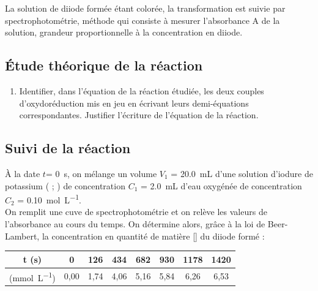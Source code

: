 \documentclass[a4paper,12pt,fleqn]{article}%
\begin{document}
La solution de diiode formée étant colorée, la transformation est suivie par spectrophotométrie, méthode qui consiste  à mesurer l'absorbance A de la solution, grandeur proportionnelle à la concentration en diiode.

	\subsection{Étude théorique de la réaction}
	\begin{enumerate}
		\item Identifier,  dans l'équation de la réaction étudiée, les deux couples d'oxydoréduction mis en jeu en écrivant leurs demi-équations correspondantes.
		Justifier l’écriture de l’équation de la réaction.
	\end{enumerate}
	\subsection{Suivi de la réaction}
	À la date $t$= \SI{0}{s}, on mélange un volume $V_1$ = \SI{20,0}{mL} d'une solution d'iodure de potassium ( ; ) de concentration $C_1$ = \SI{2,0}{mL} d'eau oxygénée  de concentration $C_2$ = \SI{0,10}{\mole\per\liter}.\\
	On remplit une cuve de spectrophotométrie et on relève les valeurs de l'absorbance au cours du temps. On détermine alors, grâce à la loi de Beer-Lambert, la concentration en quantité de matière  [] du diiode formé :
    \begin{center}
        \begin{tabular}{|c|c|c|c|c|c|c|c|}
		\hline t (s)& 0 & 126 & 434 & 682 & 930 & 1178 & 1420\\
		\hline [\ce{I2}] (\unit{\milli\mole\per\liter}) & 0,00 & 1,74 & 4,06 & 5,16 & 5,84 & 6,26 & 6,53\\
		\hline
	\end{tabular}
    \end{center}
	
\end{document}
